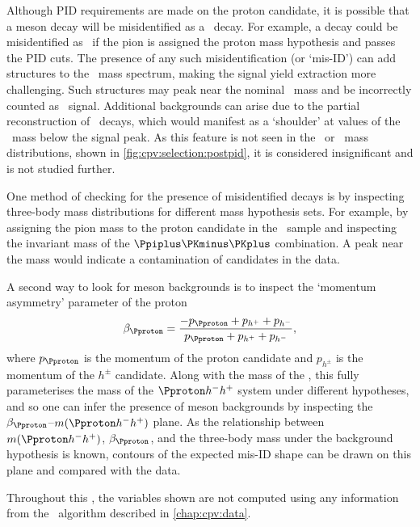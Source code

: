 Although \ac{PID} requirements are made on the proton candidate, it is possible 
that a meson decay will be misidentified as a \PLambdac\ decay.
For example, a \decay{\PDsplus}{\PKminus\PKplus\Ppiplus} decay could be 
misidentified as \LcTopKK\ if the pion is assigned the proton mass hypothesis 
and passes the \ac{PID} cuts.
The presence of any such misidentification (or `mis-ID') can add structures to 
the \PLambdac\ mass spectrum, making the signal yield extraction more 
challenging.
Such structures may peak near the nominal \PLambdac\ mass and be incorrectly 
counted as \PLambdac\ signal.
Additional backgrounds can arise due to the partial reconstruction of 
\PLambdac\ decays, which would manifest as a `shoulder' at values of the 
\PLambdac\ mass below the signal peak.
As this feature is not seen in the \pKK\ or \ppipi\ mass distributions, shown 
in \cref{fig:cpv:selection:postpid}, it is considered insignificant and is not 
studied further.

One method of checking for the presence of misidentified decays is by 
inspecting three-body mass distributions for different mass hypothesis sets.
For example, by assigning the pion mass to the proton candidate in the \pKK\ 
sample and inspecting the invariant mass of the $\Ppiplus\PKminus\PKplus$ 
combination.
A peak near the \PDsplus mass would indicate a contamination of \PDsplus 
candidates in the data.

A second way to look for meson backgrounds is to inspect the `momentum 
asymmetry' parameter of the proton~\cite{Aaltonen:2011jv,Artuso:2121282}
\begin{equation}
  \beta_{\Pproton} = \frac{-p_{\Pproton} + p_{\Php} + p_{\Phm}}{p_{\Pproton} + p_{\Php} + p_{\Phm}},
  \label{eqn:cpv:selection:background_study:mom_asym}
\end{equation}
where $p_{\Pproton}$ is the momentum of the proton candidate and $p_{h^{\pm}}$ 
is the momentum of the $h^{\pm}$ candidate.
Along with the mass of the \PLambdac, this fully parameterises the mass of the 
$\phh$ system under different hypotheses, and so one can infer the presence of 
meson backgrounds by inspecting the $\beta_{\Pproton}$--$m(\phh)$ plane.
As the relationship between $m(\phh)$, $\beta_{\Pproton}$, and the three-body 
mass under the background hypothesis is known, contours of the expected mis-ID 
shape can be drawn on this plane and compared with the data.

Throughout this , the variables 
shown are not computed using any information from the \decaytreefitter\ 
algorithm described in \cref{chap:cpv:data}.

